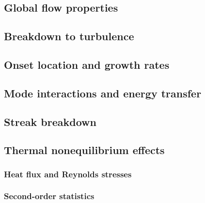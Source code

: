 \subsection{Global flow properties}

\subsection{Breakdown to turbulence}
\subsection{Onset location and growth rates}

\subsection{Mode interactions and energy transfer}
\subsection{Streak breakdown}

\subsection{Thermal nonequilibrium effects}
\subsubsection{Heat flux and Reynolds stresses}
\subsubsection{Second-order statistics}



